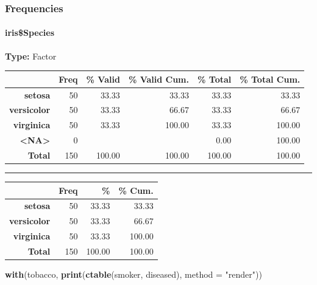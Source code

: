 \documentclass[]{article}
\newenvironment{Shaded}{\begin{snugshade}}{\end{snugshade}}
\newcommand{\DataTypeTok}[1]{\textcolor[rgb]{0.13,0.29,0.53}{#1}}
\newcommand{\KeywordTok}[1]{\textcolor[rgb]{0.13,0.29,0.53}{\textbf{#1}}}
\newcommand{\NormalTok}[1]{#1}
\newcommand{\OperatorTok}[1]{\textcolor[rgb]{0.81,0.36,0.00}{\textbf{#1}}}
\newcommand{\OtherTok}[1]{\textcolor[rgb]{0.56,0.35,0.01}{#1}}
\newcommand{\StringTok}[1]{\textcolor[rgb]{0.31,0.60,0.02}{#1}}
\let\oldparagraph\paragraph
\renewcommand{\paragraph}[1]{\oldparagraph{#1}\mbox{}}
\begin{document}
\hypertarget{frequencies}{%
\subsubsection{Frequencies}\label{frequencies}}

\hypertarget{irisspecies}{%
\paragraph{iris\$Species}\label{irisspecies}}

\textbf{Type:} Factor

\begin{longtable}[]{@{}rrrrrr@{}}
\toprule
~ & Freq & \% Valid & \% Valid Cum. & \% Total & \% Total
Cum.\tabularnewline
\midrule
\endhead
\textbf{setosa} & 50 & 33.33 & 33.33 & 33.33 & 33.33\tabularnewline
\textbf{versicolor} & 50 & 33.33 & 66.67 & 33.33 & 66.67\tabularnewline
\textbf{virginica} & 50 & 33.33 & 100.00 & 33.33 & 100.00\tabularnewline
\textbf{\textless NA\textgreater{}} & 0 & & & 0.00 &
100.00\tabularnewline
\textbf{Total} & 150 & 100.00 & 100.00 & 100.00 & 100.00\tabularnewline
\bottomrule
\end{longtable}

\begin{center}\rule{0.5\linewidth}{\linethickness}\end{center}

\begin{Shaded}
\end{Shaded}

\begin{longtable}[]{@{}rrrr@{}}
\toprule
~ & Freq & \% & \% Cum.\tabularnewline
\midrule
\endhead
\textbf{setosa} & 50 & 33.33 & 33.33\tabularnewline
\textbf{versicolor} & 50 & 33.33 & 66.67\tabularnewline
\textbf{virginica} & 50 & 33.33 & 100.00\tabularnewline
\textbf{Total} & 150 & 100.00 & 100.00\tabularnewline
\bottomrule
\end{longtable}

\begin{Shaded}
\begin{Highlighting}[]
\KeywordTok{with}\NormalTok{(tobacco, }\KeywordTok{print}\NormalTok{(}\KeywordTok{ctable}\NormalTok{(smoker, diseased), }\DataTypeTok{method =} \StringTok{"render"}\NormalTok{))}
\end{Highlighting}
\end{Shaded}
\end{document}
